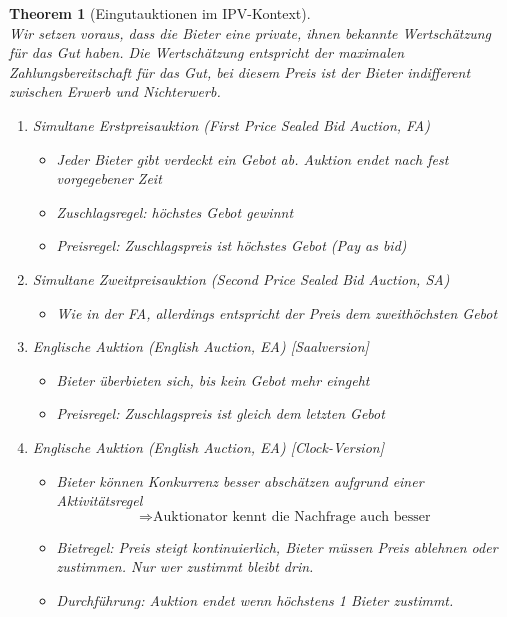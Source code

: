 \documentclass[12pt]{extreport} %
\theoremstyle{named}
\theoremstyle{nnamed}
\newtheorem*{unnamedtheorem*}{Theorem}
\theoremstyle{itshape}
\theoremstyle{normal}
\begin{document}
\begin{unnamedtheorem*}[Eingutauktionen im IPV-Kontext] ~\\
Wir setzen voraus, dass die Bieter eine private, ihnen bekannte Wertschätzung für das Gut haben. Die Wertschätzung entspricht der maximalen Zahlungsbereitschaft für das Gut, bei diesem Preis ist der Bieter indifferent zwischen Erwerb und Nichterwerb.
	
	\begin{enumerate}
		\item Simultane Erstpreisauktion (First Price Sealed Bid Auction, FA)   
			\begin{itemize}
				\item Jeder Bieter gibt verdeckt ein Gebot ab. Auktion endet nach fest vorgegebener Zeit
				\item Zuschlagsregel: höchstes Gebot gewinnt
				\item Preisregel: Zuschlagspreis ist höchstes Gebot (Pay as bid)
			\end{itemize}
		\item Simultane Zweitpreisauktion (Second Price Sealed Bid Auction, SA)   
			\begin{itemize}
				\item Wie in der FA, allerdings entspricht der Preis dem zweithöchsten Gebot
			\end{itemize}
		\item Englische Auktion (English Auction, EA) [Saalversion]   
			\begin{itemize}
				\item Bieter überbieten sich, bis kein Gebot mehr eingeht
				\item Preisregel: Zuschlagspreis ist gleich dem letzten Gebot
			\end{itemize}
		\item Englische Auktion (English Auction, EA) [Clock-Version]
			\begin{itemize}
				\item Bieter können Konkurrenz besser abschätzen aufgrund einer Aktivitätsregel
					$$ \Rightarrow \text{Auktionator kennt die Nachfrage auch besser} $$
				\item Bietregel: Preis steigt kontinuierlich, Bieter müssen Preis ablehnen oder zustimmen. Nur wer zustimmt bleibt drin.
				\item Durchführung: Auktion endet wenn höchstens 1 Bieter zustimmt.

\end{itemize}
\end{enumerate}
\end{unnamedtheorem*}
\end{document}

